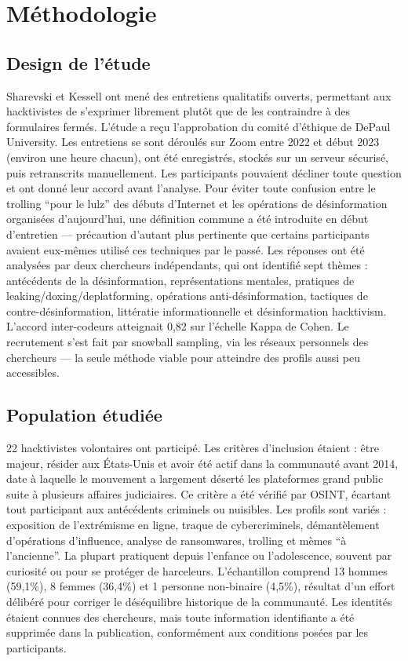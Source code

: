 \section{Méthodologie}

\subsection{Design de l’étude}

Sharevski et Kessell ont mené des entretiens qualitatifs ouverts, permettant aux hacktivistes de s’exprimer librement plutôt que de les contraindre à des formulaires fermés. L’étude a reçu l’approbation du comité d’éthique de DePaul University. Les entretiens se sont déroulés sur Zoom entre 2022 et début 2023 (environ une heure chacun), ont été enregistrés, stockés sur un serveur sécurisé, puis retranscrits manuellement. Les participants pouvaient décliner toute question et ont donné leur accord avant l’analyse.
\medskip
Pour éviter toute confusion entre le trolling “pour le lulz” des débuts d’Internet et les opérations de désinformation organisées d’aujourd’hui, une définition commune a été introduite en début d’entretien — précaution d’autant plus pertinente que certains participants avaient eux-mêmes utilisé ces techniques par le passé.
\medskip
Les réponses ont été analysées par deux chercheurs indépendants, qui ont identifié sept thèmes : antécédents de la désinformation, représentations mentales, pratiques de leaking/doxing/deplatforming, opérations anti-désinformation, tactiques de contre-désinformation, littératie informationnelle et désinformation hacktivism. L’accord inter-codeurs atteignait 0,82 sur l’échelle Kappa de Cohen. Le recrutement s’est fait par snowball sampling, via les réseaux personnels des chercheurs — la seule méthode viable pour atteindre des profils aussi peu accessibles.

\subsection{Population étudiée}

22 hacktivistes volontaires ont participé. Les critères d’inclusion étaient : être majeur, résider aux États-Unis et avoir été actif dans la communauté avant 2014, date à laquelle le mouvement a largement déserté les plateformes grand public suite à plusieurs affaires judiciaires. Ce critère a été vérifié par OSINT, écartant tout participant aux antécédents criminels ou nuisibles.
\medskip
Les profils sont variés : exposition de l’extrémisme en ligne, traque de cybercriminels, démantèlement d’opérations d’influence, analyse de ransomwares, trolling et mèmes “à l’ancienne”. La plupart pratiquent depuis l’enfance ou l’adolescence, souvent par curiosité ou pour se protéger de harceleurs.
\medskip
L’échantillon comprend 13 hommes (59,1\%), 8 femmes (36,4\%) et 1 personne non-binaire (4,5\%), résultat d’un effort délibéré pour corriger le déséquilibre historique de la communauté. Les identités étaient connues des chercheurs, mais toute information identifiante a été supprimée dans la publication, conformément aux conditions posées par les participants.